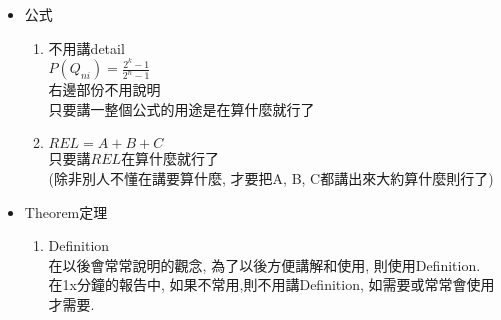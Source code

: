 \begin{enumerate}
{\begin{itemize}
{\begin{itemize}
{\begin{enumerate}
              \item
              {
                不要把整個演算法顯示出來一步步講
              } %

              \item
              {
                不要用pseudocode
              } %
            \end{enumerate}
          } %

          \item
          {
            Yes
            \begin{enumerate}
              \item
              {
                盡量使用圖片來講解演算法
              } %
            \end{enumerate}
          } %
        \end{itemize}
      } %

      \item
      {
        公式
        \begin{enumerate}
          \item
          {
            不用講detail\\
            $ P( Q_{ni} ) = \frac{ 2^{k} - 1}{ 2^{n} - 1} $\\
            右邊部份不用說明\\
            只要講一整個公式的用途是在算什麼就行了
          } %

          \item
          {
            $ REL = A + B + C $\\
            只要講$REL$在算什麼就行了\\
            (除非別人不懂在講要算什麼, 才要把A, B, C都講出來大約算什麼則行了)
          } %
        \end{enumerate}
      } %

      \item
      {
        Theorem定理
        \begin{enumerate}
          \item
          {
            Definition\\
            在以後會常常說明的觀念, 為了以後方便講解和使用, 則使用Definition.\\
            在1x分鐘的報告中, 如果不常用,則不用講Definition, 如需要或常常會使用才需要.\\
          } %


\end{enumerate}}
\end{itemize}}
\end{enumerate}

